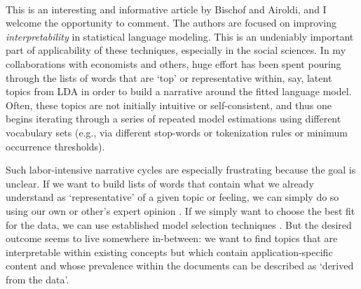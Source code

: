 \documentclass[12pt]{article}
\newcommand{\sgl}{\setstretch{1.4}}
\begin{document}
\sgl 

\pagestyle{empty}

~
\vskip 1cm 


\vskip 1cm


 

\vskip 2cm\noindent
This is an interesting and informative article by Bischof and Airoldi, and I welcome the opportunity to comment.  The authors are focused on improving  {\it interpretability} in statistical language modeling. This is an undeniably important part of applicability of these techniques, especially in the social sciences.  In my collaborations with economists and others, huge effort has been spent  pouring through the lists of words that are `top' or representative within, say, latent topics from LDA \citep{blei_latent_2003} in order to build a narrative around the fitted language model.  Often, these topics are not initially intuitive or self-consistent, and thus one begins iterating through a series of repeated model estimations using different vocabulary sets (e.g., via different stop-words or tokenization rules or minimum occurrence thresholds). 

Such labor-intensive narrative cycles are especially frustrating because the goal is unclear. If we want to build lists of words that contain what we already understand as `representative' of a given topic or feeling, we can simply do so using our own or other's expert opinion \citep[e.g.,][is an example of such `dictionary-based' analysis]{tetlock_giving_2007}.  If we simply want to choose the best fit for the data, we can use established model selection techniques \citep[e.g., the Bayes factors for LDA in][]{taddy_estimation_2012}.  But the desired outcome seems to live somewhere in-between: we want to find topics that are interpretable within existing concepts but which contain application-specific content and whose prevalence within the documents can be described as `derived from the data'.  
  
\end{document}
